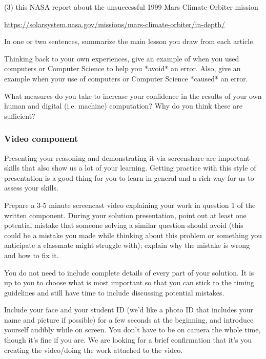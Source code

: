 \begin{enumerate}
(3) this NASA report about the unsuccessful 1999 Mars Climate Orbiter mission

\url{https://solarsystem.nasa.gov/missions/mars-climate-orbiter/in-depth/}

In one or two sentences, summarize the main lesson you draw from each article.

Thinking back to your own experiences, give an example of when you used computers or Computer Science
to help you *avoid* an error. Also, give an example when your use of computers or Computer Science
*caused* an error.

What measures do you take to increase your confidence in the results of your own human and digital 
(i.e. machine) computation? Why do you think these are sufficient?


\end{enumerate}

\subsubsection*{Video component}

Presenting your reasoning and demonstrating it via screenshare are important skills that 
also show us a lot of your learning. Getting practice with this style of presentation 
is a good thing for you to learn in general and a rich way for us to assess your skills. 

Prepare a 3-5 minute screencast video explaining your work in question 1 of the written component.
During your solution presentation, point out at least one potential mistake that someone 
solving a similar question should avoid (this could be a mistake you made while thinking 
about this problem or something you anticipate a classmate might struggle with); 
explain why the mistake is wrong and how to fix it. 

You do not need to include complete details of every part of your solution. 
It is up to you to choose what is most important so that you can stick to the 
timing guidelines and still have time to include discussing potential mistakes.

Include your face and your student ID (we'd like a photo ID that includes your name 
and picture if possible) for a few seconds at the beginning, and introduce yourself 
audibly while on screen. You don't have to be on camera the whole time, though it's fine 
if you are. We are looking for a brief confirmation that it's you creating the 
video/doing the work attached to the video.

